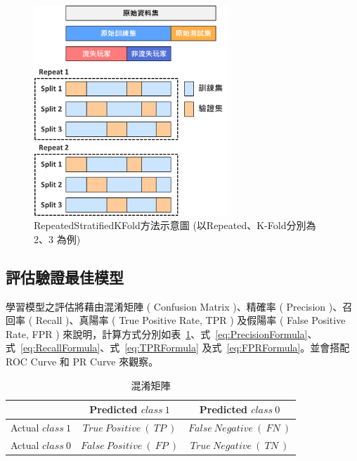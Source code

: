 \begin{figure}[!htb]
  \begin{center}
    \includegraphics[width=0.65\textwidth]{figures/Image_RepeatedStratifiedKFold.png}
    \caption[RepeatedStratifiedKFold示意圖]{RepeatedStratifiedKFold方法示意圖 (以Repeated、K-Fold分別為 2、3 為例) }
    \label{fig:Image_RepeatedStratifiedKFold}
  \end{center}
\end{figure}

\subsection{評估驗證最佳模型}
\label{subsec:EvaluateBestModel}

學習模型之評估將藉由混淆矩陣 ( Confusion Matrix )、精確率 ( Precision )、召回率 ( Recall )、真陽率 ( True Positive Rate, TPR ) 及假陽率 ( False Positive Rate, FPR ) 來說明，計算方式分別如表~\ref{tab:ConfusionMatrix}、式~\ref{eq:PrecisionFormula}、式~\ref{eq:RecallFormula}、式~\ref{eq:TPRFormula} 及式~\ref{eq:FPRFormula}。並會搭配 ROC Curve 和 PR Curve 來觀察。

\begin{table}[!htb]
	\centering
	\begin{tabular}{|c|c|c|}
	\hline
	& Predicted $class\ 1$ & Predicted $class\ 0$ \\
    \hline
    Actual $class\ 1$ & $True\ Positive\ (\ TP\ )$ & $False\ Negative\ (\ FN\ )$ \\
    \hline
    Actual $class\ 0$ & $False\ Positive\ (\ FP\ )$ & $True\ Negative\ (\ TN\ )$ \\
    \hline
	\end{tabular}
	\caption[混淆矩陣]{混淆矩陣}
	\label{tab:ConfusionMatrix}
\end{table}

